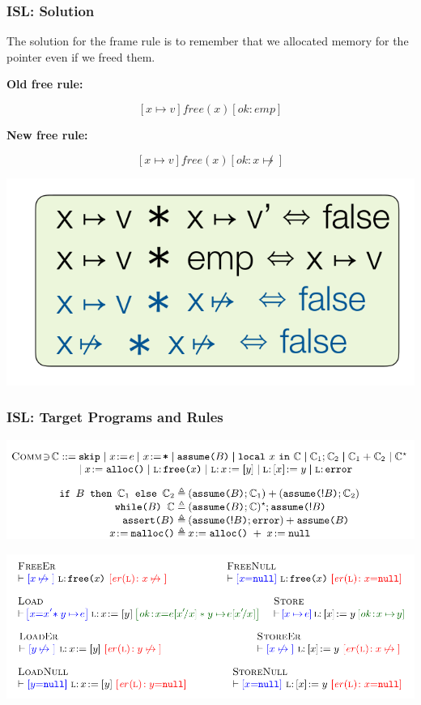 \documentclass[11pt]{beamer}
\begin{document}
\begin{frame}\frametitle{ISL: Solution}
The solution for the frame rule is to remember that we allocated memory for the pointer even if we freed them.

\textbf{Old free rule:}

\[[x\mapsto v] free(x) [ok:emp]\]

\textbf{New free rule:}

\[[x\mapsto v] free(x) [ok:x\not\mapsto]\]

\begin{center}
\includegraphics[scale=0.2]{compatible.png}
\end{center}
\end{frame}

\begin{frame}\frametitle{ISL: Target Programs and Rules}
\begin{center}
\includegraphics[scale=0.3]{program.png}

\includegraphics[scale=0.3]{error.png}
\end{center}
\end{frame}
\end{document}
